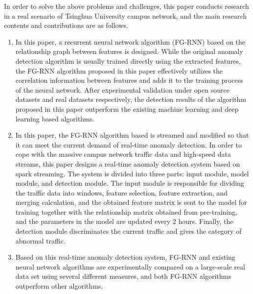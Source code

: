 \begin{abstract*}
  In order to solve the above problems and challenges, this paper conducts research in a real scenario of Tsinghua University campus network, and the main research contents and contributions are as follows.
  \begin{enumerate}
    \item In this paper, a recurrent neural network algorithm (FG-RNN) based on the relationship graph between features is designed. While the original anomaly detection algorithm is usually trained directly using the extracted features, the FG-RNN algorithm proposed in this paper effectively utilizes the correlation information between features and adds it to the training process of the neural network. After experimental validation under open source datasets and real datasets respectively, the detection results of the algorithm proposed in this paper outperform the existing machine learning and deep learning based algorithms.
    \item In this paper, the FG-RNN algorithm based is streamed and modified so that it can meet the current demand of real-time anomaly detection. In order to cope with the massive campus network traffic data and high-speed data streams, this paper designs a real-time anomaly detection system based on spark streaming. The system is divided into three parts: input module, model module, and detection module. The input module is responsible for dividing the traffic data into windows, feature selection, feature extraction, and merging calculation, and the obtained feature matrix is sent to the model for training together with the relationship matrix obtained from pre-training, and the parameters in the model are updated every 2 hours. Finally, the detection module discriminates the current traffic and gives the category of abnormal traffic.
    \item Based on this real-time anomaly detection system, FG-RNN and existing neural network algorithms are experimentally compared on a large-scale real data set using several different measures, and both FG-RNN algorithms outperform other algorithms.
  \end{enumerate}



\end{abstract*}

